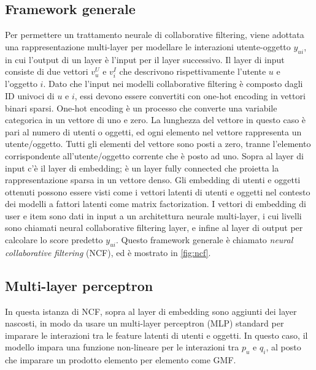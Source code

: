 \subsection{Framework generale}
Per permettere un trattamento neurale di collaborative filtering, viene adottata una rappresentazione multi-layer per modellare le interazioni utente-oggetto $y_{ui}$, in cui l'output di un layer è l'input per il layer successivo. Il layer di input consiste di due vettori $v_u^U$ e $v_i^I$ che descrivono rispettivamente l'utente $u$ e l'oggetto $i$. Dato che l'input nei modelli collaborative filtering è composto dagli ID univoci di $u$ e $i$, essi devono essere convertiti con one-hot encoding in vettori binari sparsi. One-hot encoding è un processo che converte una variabile categorica in un vettore di uno e zero. La lunghezza del vettore in questo caso è pari al numero di utenti o oggetti, ed ogni elemento nel vettore rappresenta un utente/oggetto. Tutti gli elementi del vettore sono posti a zero, tranne l'elemento corrispondente all'utente/oggetto corrente che è posto ad uno. Sopra al layer di input c'è il layer di embedding; è un layer fully connected che proietta la rappresentazione sparsa in un vettore denso. Gli embedding di utenti e oggetti ottenuti possono essere visti come i vettori latenti di utenti e oggetti nel contesto dei modelli a fattori latenti come matrix factorization. I vettori di embedding di user e item sono dati in input a un architettura neurale multi-layer, i cui livelli sono chiamati neural collaborative filtering layer, e infine al layer di output per calcolare lo score predetto $y_{ui}$. Questo framework generale è chiamato \textit{neural collaborative filtering} (NCF), ed è mostrato in \autoref{fig:ncf}.

\subsection{Multi-layer perceptron}
In questa istanza di NCF, sopra al layer di embedding sono aggiunti dei layer nascosti, in modo da usare un multi-layer perceptron (MLP) standard per imparare le interazioni tra le feature latenti di utenti e oggetti. In questo caso, il modello impara una funzione non-lineare per le interazioni tra $p_u$ e $q_i$, al posto che imparare un prodotto elemento per elemento come GMF.


